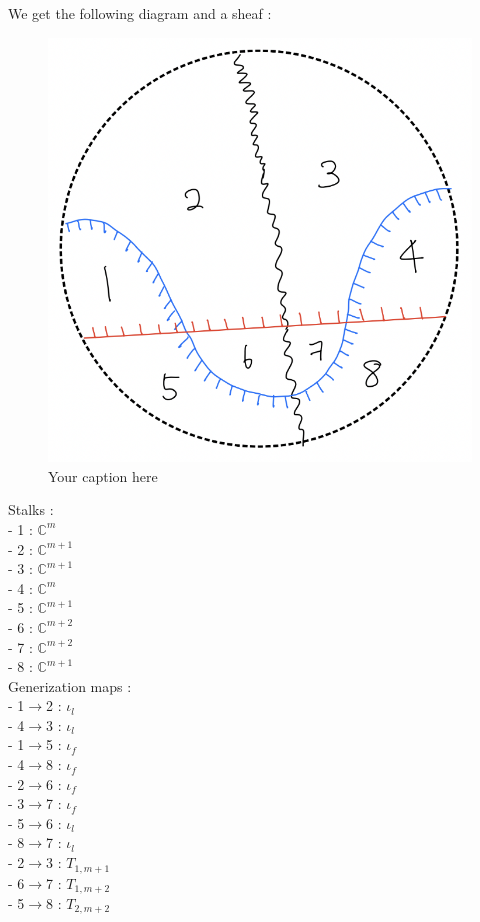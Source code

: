 We get the following diagram and a sheaf :

\begin{figure}[H] %
    \centering
    \includegraphics[width=\linewidth]{diagrams/lemma5/5.png} %
    \caption{Your caption here}
    \label{fig:your-label}
\end{figure}

Stalks : \\
- 1 : $\mathbb{C}^{m}$\\
- 2 : $\mathbb{C}^{m+1}$\\
- 3 : $\mathbb{C}^{m+1}$\\
- 4 : $\mathbb{C}^{m}$\\
- 5 : $\mathbb{C}^{m+1}$\\
- 6 : $\mathbb{C}^{m+2}$\\
- 7 : $\mathbb{C}^{m+2}$\\
- 8 : $\mathbb{C}^{m+1}$\\

Generization maps : \\


- 1$\rightarrow$2 : $\iota_l$\\
- 4$\rightarrow$3 : $\iota_l$\\
- 1$\rightarrow$5 : $\iota_f$\\
- 4$\rightarrow$8 : $\iota_f$\\
- 2$\rightarrow$6 : $\iota_f$\\
- 3$\rightarrow$7 : $\iota_f$\\
- 5$\rightarrow$6 : $\iota_l$\\
- 8$\rightarrow$7 : $\iota_l$\\
- 2$\rightarrow$3 : $T_{1,m+1}$\\
- 6$\rightarrow$7 : $T_{1,m+2}$\\
- 5$\rightarrow$8 : $T_{2,m+2}$\\

